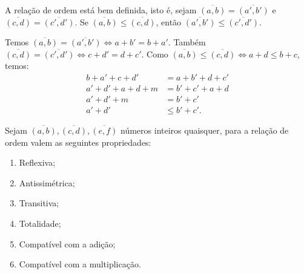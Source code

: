 \documentclass[../main.tex]{subfiles}
\begin{document}
\begin{prop}
    A relação de ordem está bem definida, isto é, sejam $\overline{(a,b)} = \overline{(a',b')}$ e $\overline{(c,d)} = \overline{(c',d')}$. Se $\overline{(a,b)} \leq \overline{(c,d)}$, então $\overline{(a',b')} \leq \overline{(c',d')}$.
\end{prop}
\begin{dem}
    Temos $\overline{(a,b)} = \overline{(a',b')} \iff a+b' = b+a'$. 
    Também $\overline{(c,d)} = \overline{(c',d')} \iff c+d' = d+c'$. 
    Como $\overline{(a,b)} \leq \overline{(c,d)} \iff a+d \leq b+c$, temos:
    \begin{align*}
        b+a'+c+d' &= a+b' + d+c' \\
        a'+d' + a+d + m &= b' + c' + a + d \\
        a'+d' + m &= b' + c'  \\
        a'+d' & \leq b'+c'.
    \end{align*}
     
\end{dem}
\begin{prop}{Sejam $\overline{(a,b)}, \overline{(c,d)}, \overline{(e,f)}$ números inteiros quaisquer, para a relação de ordem valem as seguintes propriedades:}\label{int-prop-relacaoOrdem}
    \begin{enumerate}[label=(\roman*)]
        \item Reflexiva;
        \item Antissimétrica;
        \item Transitiva;
        \item Totalidade;
        \item Compatível com a adição;
        \item Compatível com a multiplicação.
    \end{enumerate}
\end{prop}
\end{document}
